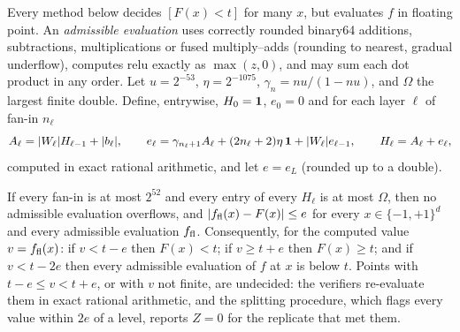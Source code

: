 Every method below decides $[F(x)<t]$ for many $x$, but evaluates $f$ in floating
point. An \emph{admissible evaluation} uses correctly rounded binary64 additions,
subtractions, multiplications or fused multiply--adds (rounding to nearest, gradual
underflow), computes $\mathrm{relu}$ exactly as $\max(z,0)$, and may sum each dot
product in any order. Let $u=2^{-53}$, $\eta=2^{-1075}$, $\gamma_n=nu/(1-nu)$, and
$\Omega$ the largest finite double. Define, entrywise, $H_0=\mathbf{1}$, $e_0=0$ and for each
layer $\ell$ of fan-in $n_\ell$
\[
A_\ell=|W_\ell|H_{\ell-1}+|b_\ell|,\qquad
e_\ell=\gamma_{n_\ell+1}A_\ell+(2n_\ell+2)\eta\,\mathbf{1}+|W_\ell|e_{\ell-1},\qquad
H_\ell=A_\ell+e_\ell,
\]
computed in exact rational arithmetic, and let $e=e_L$ (rounded up to a double).

\begin{lemma}\label{lem:certeval}
If every fan-in is at most $2^{52}$ and every entry of every $H_\ell$ is at most
$\Omega$, then no admissible evaluation
overflows, and $|f_{\rm fl}(x)-F(x)|\le e$ for every $x\in\{-1,+1\}^d$ and every
admissible evaluation $f_{\rm fl}$. Consequently, for the computed value $v=f_{\rm fl}(x)$:
if $v<t-e$ then $F(x)<t$; if $v\ge t+e$ then $F(x)\ge t$; and if $v<t-2e$ then every
admissible evaluation of $f$ at $x$ is below $t$. Points with $t-e\le v<t+e$, or with
$v$ not finite, are undecided: the verifiers re-evaluate them in exact rational
arithmetic, and the splitting procedure, which flags every value within $2e$ of a
level, reports $Z=0$ for the replicate that met them.
\end{lemma}

